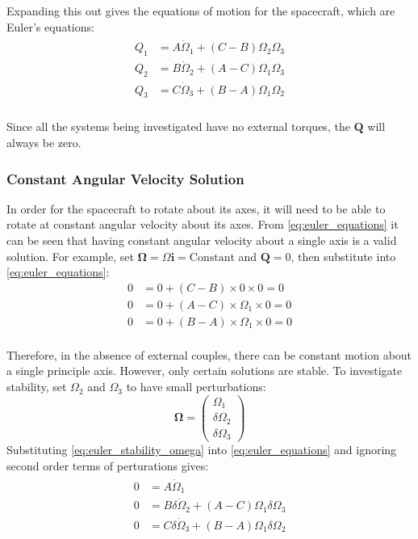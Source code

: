 \documentclass[12]{article}
\begin{document}
\begin{multicols*}{2}
Expanding this out gives the equations of motion for the spacecraft, which are Euler's equations:
\begin{align}
\label{eq:euler_equations}
\begin{split}
Q_1 &= A\dot{\Omega}_1 + (C - B)\Omega_2\Omega_3 \\
Q_2 &= B\dot{\Omega}_2 + (A - C)\Omega_1\Omega_3 \\
Q_3 &= C\dot{\Omega}_3 + (B - A)\Omega_1\Omega_2 \\
\end{split}
\end{align}

Since all the systems being investigated have no external torques, the $\bm{Q}$ will always be zero.

\subsubsection{Constant Angular Velocity Solution}

In order for the spacecraft to rotate about its axes, it will need to be able to rotate at constant angular velocity about its axes. From \cref{eq:euler_equations} it can be seen that having constant angular velocity about a single axis is a valid solution. For example, set $\bm{\Omega} = \Omega\bm{i} = \textrm{Constant}$ and $\bm{Q}=0$, then substitute into \cref{eq:euler_equations}:
\begin{align*}
0 &= 0 + (C - B)\times 0 \times 0 = 0 \\
0 &= 0 + (A - C)\times\Omega_1 \times 0 = 0 \\
0 &= 0 + (B - A)\times \Omega_1 \times 0 = 0 \\
\end{align*}

Therefore, in the absence of external couples, there can be constant motion about a single principle axis. However, only certain solutions are stable. To investigate stability, set $\Omega_2$ and $\Omega_3$ to have small perturbations:
\begin{equation} \label{eq:euler_stability_omega}
\bm{\Omega} =
\begin{pmatrix}
\Omega_1 \\
\delta\Omega_2 \\
\delta\Omega_3
\end{pmatrix}
\end{equation}
Substituting \cref{eq:euler_stability_omega} into \cref{eq:euler_equations} and ignoring second order terms of perturations gives:
\begin{align}
\label{eq:euler_stability_equations}
\begin{split}
0 &= A\dot{\Omega}_1 \\
0 &= B\delta\dot{\Omega}_2 + (A - C)\Omega_1\delta\Omega_3 \\
0 &= C\delta\dot{\Omega}_3 + (B - A)\Omega_1\delta\Omega_2 \\
\end{split}
\end{align}


\end{multicols*}
\end{document}
